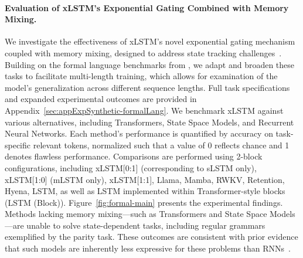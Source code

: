 \paragraph{Evaluation of xLSTM's Exponential Gating Combined with Memory Mixing.} We investigate the effectiveness of xLSTM's novel exponential gating mechanism coupled with memory mixing, designed to address state tracking challenges~\citep{Merrill:24, Merrill:23}. Building on the formal language benchmarks from \citet{Deletang:23}, we adapt and broaden these tasks to facilitate multi-length training, which allows for examination of the model's generalization across different sequence lengths. Full task specifications and expanded experimental outcomes are provided in Appendix~\ref{sec:appExpSynthetic-formalLang}. We benchmark xLSTM against various alternatives, including Transformers, State Space Models, and Recurrent Neural Networks. Each method's performance is quantified by accuracy on task-specific relevant tokens, normalized such that a value of 0 reflects chance and 1 denotes flawless performance. Comparisons are performed using 2-block configurations, including xLSTM[0:1] (corresponding to sLSTM only), xLSTM[1:0] (mLSTM only), xLSTM[1:1], Llama, Mamba, RWKV, Retention, Hyena, LSTM, as well as LSTM implemented within Transformer-style blocks (LSTM (Block)). Figure~\ref{fig:formal-main} presents the experimental findings. Methods lacking memory mixing—such as Transformers and State Space Models—are unable to solve state-dependent tasks, including regular grammars exemplified by the parity task. These outcomes are consistent with prior evidence that such models are inherently less expressive for these problems than RNNs~\citep{Merrill:24, Merrill:23, Deletang:23}.

